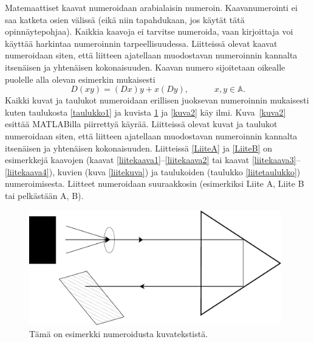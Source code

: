 \documentclass[english, 12pt, a4paper, sci, utf8, a-1b, online]{aaltothesis}
\begin{document}
Matemaattiset kaavat numeroidaan arabialaisin
numeroin. Kaavanumerointi ei saa katketa osien välissä (eikä niin
tapahdukaan, jos käytät tätä opinnäytepohjaa). Kaikkia kaavoja ei tarvitse
numeroida, vaan kirjoittaja voi käyttää harkintaa numeroinnin
tarpeellisuudessa.  Liitteissä olevat kaavat numeroidaan siten, että
liitteen ajatellaan muodostavan numeroinnin kannalta itsenäisen ja
yhtenäisen kokonaisuuden. Kaavan numero sijoitetaan oikealle puolelle
alla olevan esimerkin mukaisesti
\begin{equation}
D(xy) = (Dx)y + x(Dy),  \hspace{3em} x,y \in \mathbb{A}.
\end{equation}
Kaikki kuvat ja taulukot numeroidaan erillisen juoksevan numeroinnin
mukaisesti kuten taulukosta \ref{taulukko1} ja kuvista \ref{kuva1} ja 
\ref{kuva2} käy ilmi. Kuva~\ref{kuva2} esittää MATLABilla piirrettyä käyrää. 
Liitteissä olevat kuvat ja taulukot numeroidaan siten, että
liitteen ajatellaan muodostavan numeroinnin kannalta itsenäisen ja
yhtenäisen kokonaisuuden. Liitteissä \ref{LiiteA} ja \ref{LiiteB} on
esimerkkejä kaavojen (kaavat \ref{liitekaava1}--\ref{liitekaava2} tai
kaavat \ref{liitekaava3}--\ref{liitekaava4}), kuvien (kuva
\ref{liitekuva}) ja taulukoiden (taulukko \ref{liitetaulukko})
numeroimisesta.  Liitteet numeroidaan suuraakkosin (esimerkiksi Liite
A, Liite B tai pelkästään A, B).
\begin{figure}[htb]
\centering
\includegraphics[height=5cm]{./linediagram.pdf}
\caption{Tämä on esimerkki numeroidusta kuvatekstistä. \label{kuva1}}
\end{figure}
\end{document}
